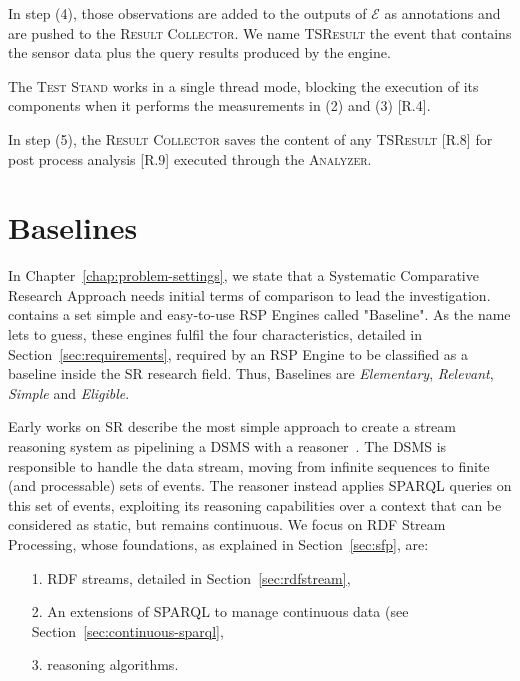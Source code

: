 In step (4), those observations are added to the outputs of $\mathcal{E}$ as annotations and are pushed to the \textsc{Result Collector}.  We name \textsc{TSResult} the event that contains the sensor data plus the query results produced by the engine.  

The \textsc{Test Stand} works in a single thread mode, blocking the execution of its components when it performs the measurements in (2) and (3) [R.4].  

In step (5), the \textsc{Result Collector} saves the content of any \textsc{TSResult} [R.8] for post process analysis [R.9] executed through the \textsc{Analyzer}.

\section{Baselines}\label{sec:baselines}

\noindent In Chapter~\ref{chap:problem-settings}, we state that a Systematic Comparative Research Approach needs initial terms of comparison to lead the investigation. \name contains a set simple and easy-to-use RSP Engines called "Baseline". As the name lets to guess, these engines fulfil the four characteristics, detailed in Section~\ref{sec:requirements}, required by an RSP Engine to be classified as a baseline inside the SR research field. Thus, \name Baselines are \textit{Elementary}, \textit{Relevant}, \textit{Simple} and \textit{Eligible}.

Early works on SR describe the most simple approach to create a stream reasoning system as pipelining a DSMS with a reasoner~\cite{DBLP:conf/fis/ValleCBBC08,Walavalkar08streamingknowledge}. The DSMS is responsible to handle the data stream, moving from infinite sequences to finite (and processable) sets of events. The reasoner instead applies SPARQL queries on this set of events, exploiting its reasoning capabilities over a context that can be considered as static, but remains continuous. We focus on RDF Stream Processing, whose foundations, as explained in Section~\ref{sec:sfp}, are: 
\begin{enumerate}
\item[1.] RDF streams, detailed in Section~\ref{sec:rdfstream},
\item[2.] An extensions of SPARQL to manage continuous data (see Section~\ref{sec:continuous-sparql},
\item[3.] reasoning algorithms.
\end{enumerate}


